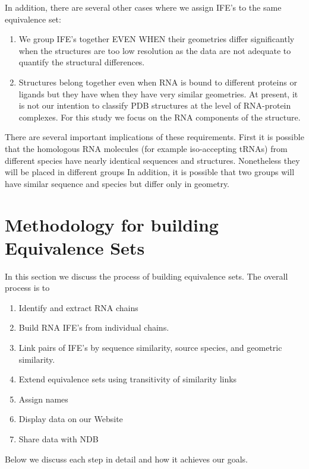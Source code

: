 In addition, there are several other cases where we assign IFE’s to the same
equivalence set:

\begin{enumerate}
  \item We group IFE’s together EVEN WHEN their geometries differ significantly
    when the structures are too low resolution as the data are not adequate to
    quantify the structural differences. 

  \item Structures belong together even when RNA is bound to different proteins
    or ligands but they have when they have very similar geometries. At present,
    it is not our intention to classify PDB structures at the level of
    RNA-protein complexes. For this study we focus on the RNA components of the
    structure. 
\end{enumerate}

There are several important implications of these requirements. First it is
possible that the homologous RNA molecules (for example iso-accepting tRNAs)
from different species have nearly identical sequences and structures.
Nonetheless they will be placed in different groups In addition, it is possible
that two groups will have similar sequence and species but differ only in
geometry. 

\section{Methodology for building Equivalence Sets}

In this section we discuss the process of building equivalence sets. The overall
process is to
\begin{enumerate}
  \item Identify and extract RNA chains

  \item Build RNA IFE's from individual chains.

  \item Link pairs of IFE's by sequence similarity, source species, and
    geometric similarity.

  \item Extend equivalence sets using transitivity of similarity links

  \item Assign names

  \item Display data on our Website

  \item Share data with NDB
\end{enumerate}
Below we discuss each step in detail and how it achieves our goals.

